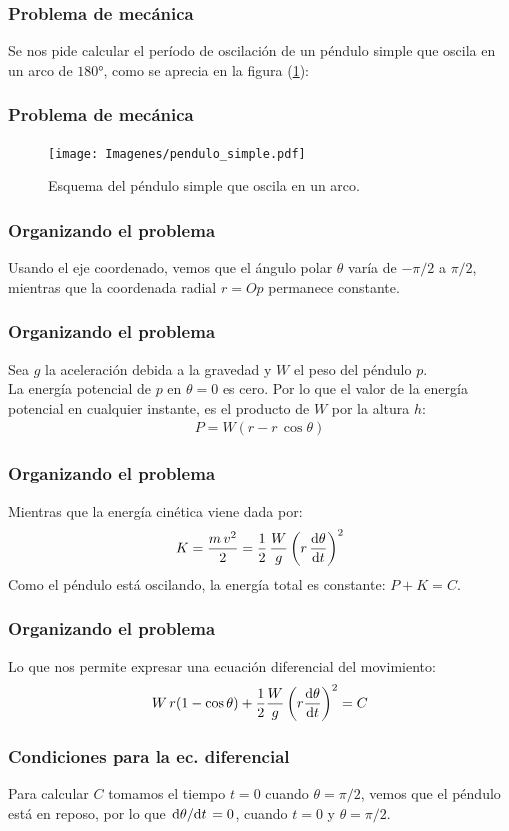 \documentclass[12pt]{beamer}
\begin{document}
\begin{frame}
\frametitle{Problema de mecánica}
Se nos pide calcular el período de oscilación de un péndulo simple que oscila en un arco de $\ang{180}$, como se aprecia en la figura (\ref{fig:figura_pendulo_simple}):
\end{frame}
\begin{frame}
\frametitle{Problema de mecánica}
\begin{figure}[!ht]
    \centering
    \texttt{[image: Imagenes/pendulo\_simple.pdf]}
    \caption{Esquema del péndulo simple que oscila en un arco.}
    \label{fig:figura_pendulo_simple}
\end{figure}
\end{frame}
\begin{frame}
\frametitle{Organizando el problema}
Usando el eje coordenado, vemos que el ángulo polar $\theta$ varía de $-\pi/2$ a $\pi/2$, mientras que la coordenada radial $r = Op$ permanece constante.
\end{frame}
\begin{frame}
\frametitle{Organizando el problema}
Sea $g$ la aceleración debida a la gravedad y $W$ el peso del péndulo $p$.
\\
\bigskip
\pause
La energía potencial de $p$ en $\theta = 0$ es cero. Por lo que el valor de la energía potencial en cualquier instante, es el producto de $W$ por la altura $h$:
\pause
\begin{align*}
P = W (r - r \, \cos \theta)
\end{align*}
\end{frame}
\begin{frame}
\frametitle{Organizando el problema}
Mientras que la energía cinética viene dada por:
\pause
\begin{align*}
K = \dfrac{m \, v^{2}}{2} = \dfrac{1}{2} \, \dfrac{W}{g} \left( r \, \dv{\theta}{t} \right)^{2}
\end{align*}
Como el péndulo está oscilando, la energía total es constante: $P + K = C$.
\end{frame}
\begin{frame}
\frametitle{Organizando el problema}
Lo que nos permite expresar una ecuación diferencial del movimiento:
\pause
\begin{align*}
W \, r (1 - \cos \theta) + \dfrac{1}{2} \dfrac{W}{g} \left( r \dv{\theta}{t} \right)^{2} = C
\end{align*}
\end{frame}
\begin{frame}
\frametitle{Condiciones para la ec. diferencial}
Para calcular $C$ tomamos el tiempo $t = 0$ cuando $\theta = \pi/2$, vemos que el péndulo está en reposo, por lo que $\dv*{\theta}{t} = 0$, cuando $t = 0$ y $\theta = \pi/2$.
\end{frame}
\end{document}
